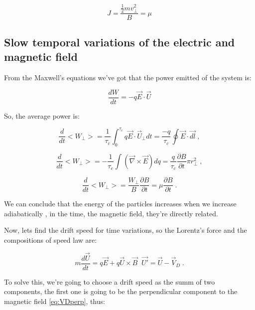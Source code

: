 \documentclass[spanish,notitlepage,letterpaper,11pt]{article} %
\numberwithin{equation}{subsection}
\begin{document}
    \begin{equation}
        J = \frac{\frac{1}{2}mv_{\perp}^2}{B} = \mu
    \end{equation}

    \subsection{Slow temporal variations of the electric and magnetic field}

    From the Maxwell's equations we've got that the power emitted of the system is:

    \begin{equation}
        \frac{dW}{dt} = -q \Vec{E}\cdot \Vec{U}
    \end{equation}

    So, the average power is:

    \begin{equation*}
        \frac{d}{dt}<W_{\perp}> = \frac{1}{\tau_c}\int_0^{\tau_c}q\Vec{E}\cdot\Vec{U}_{\perp}dt = \frac{-q}{\tau_c}\oint \Vec{E}\cdot\Vec{dl}\;,
    \end{equation*}

    \begin{equation*}
        \frac{d}{dt}<W_{\perp}> = -\frac{1}{\tau_c}\int(\Vec{\nabla}\times\Vec{E})dq = \frac{q}{\tau_c}\frac{\partial B}{\partial t} \pi r_{\perp}^2\;,
    \end{equation*}

    \begin{equation}
        \frac{d}{dt}<W_{\perp}> = \frac{W_{\perp}}{B}\frac{\partial B}{\partial t} = \mu \frac{\partial B}{\partial t}\;.
    \end{equation}

    We can conclude that the energy of the particles increases when we increase adiabatically , in the time, the magnetic field, they're directly related.

    Now, lets find the drift speed for time variations, so the Lorentz's force and the compositions of speed law are:

    \begin{equation}
        m\frac{d\Vec{U}}{dt} = q\Vec{E} + q\Vec{U}\times\Vec{B} \;\; \Vec{U'} = \Vec{U} - \Vec{V}_D\;.
    \end{equation}

    To solve this, we're going to choose a drift speed as the summ of two components, the first one is going to be the perpendicular component to the magnetic field \ref{eq:VDperp}, thus:
\end{document}
